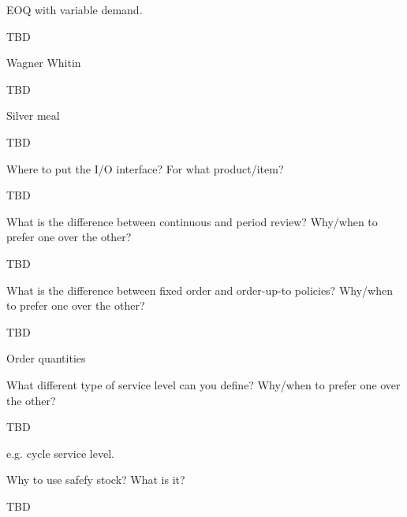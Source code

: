 \begin{question}
EOQ with variable demand.
  \begin{solution}
    TBD
  \end{solution}
\end{question}

\begin{question}
Wagner Whitin
  \begin{solution}
    TBD
  \end{solution}
\end{question}

\begin{question}
Silver meal
  \begin{solution}
    TBD
  \end{solution}
\end{question}

\begin{question}
Where to put the I/O interface? For what product/item?
  \begin{solution}
    TBD
  \end{solution}
\end{question}

\begin{question}
  What is the difference between continuous and period review? Why/when to prefer one over the other?
  \begin{solution}
    TBD
  \end{solution}
\end{question}

\begin{question}
  What is the difference between fixed order and order-up-to policies?
  Why/when to prefer one over the other?
  \begin{solution}
    TBD

Order quantities

  \end{solution}
\end{question}

\begin{question}
  What  different type of service level can you define?
  Why/when to prefer one over the other?
  \begin{solution}
    TBD

e.g. cycle service level.
  \end{solution}
\end{question}

\begin{question}
  Why to use safefy stock? What is it? 
  \begin{solution}
    TBD
  \end{solution}
\end{question}

